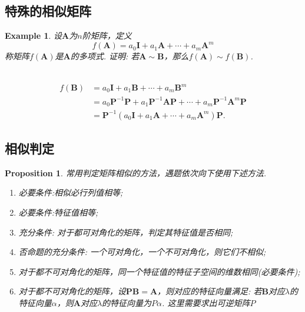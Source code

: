 \documentclass{article}
\newtheorem{proposition}[theorem]{Proposition}
\newtheorem{example}[theorem]{Example}
\newcommand{\hints}{{\color{blue} \text{hints}}}
\newcommand{\mbf}[1]{\bm{#1}}
\begin{document}
\subsection{特殊的相似矩阵}

\begin{example}
\rm 设$\mbf{A}$为$n$阶矩阵，定义
$$
f(\mbf{A}) = a_0\mbf{I} + a_1\mbf{A} + \cdots + a_m\mbf{A}^m 
$$
称矩阵$f(\mbf{A})$是$\mbf{A}$的多项式. 证明: 若$\mbf{A} \sim \mbf{B}$，那么$f(\mbf{A}) \sim f(\mbf{B})$. 

\hints\ 
$$
\begin{array}{ll}
f(\mbf{B}) &= a_0\mbf{I} + a_1\mbf{B} + \cdots + a_m\mbf{B}^m \\
&= a_0\mbf{P}^{-1}\mbf{P} + a_1\mbf{P}^{-1}\mbf{A}\mbf{P} + \cdots + a_m\mbf{P}^{-1}\mbf{A}^m\mbf{P} \\
&=\mbf{P}^{-1}(a_0\mbf{I} + a_1\mbf{A} + \cdots + a_m\mbf{A}^m) \mbf{P}.
\end{array}
$$
\end{example}

\subsection{相似判定}

\begin{proposition}
\rm 常用判定矩阵相似的方法，遇题依次向下使用下述方法.
\begin{enumerate}
	\item 必要条件:相似必行列值相等;
	\item 必要条件:特征值相等;
	\item 充分条件: 对于都可对角化的矩阵，判定其特征值是否相同;
	\item 否命题的充分条件: 一个可对角化，一个不可对角化，则它们不相似;
	\item 对于都不可对角化的矩阵，同一个特征值的特征子空间的维数相同(必要条件);	
	\item 对于都不可对角化的矩阵，设$\mbf{P}\mbf{B} = \mbf{A}$，则对应的特征向量满足: 若$\mbf{B}$对应$\lambda$的特征向量$\alpha$，则$\mbf{A}$对应$\lambda$的特征向量为$P\alpha$. 这里需要求出可逆矩阵$P$
\end{enumerate}
\end{proposition}
\end{document}
